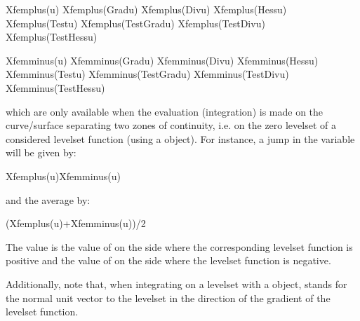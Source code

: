 \documentclass[a4paper,11pt,english]{sphinxmanual}
\begin{document}
\begin{sphinxVerbatim}[commandchars=\\\{\}]
Xfem\PYGZus{}plus(u)
Xfem\PYGZus{}plus(Grad\PYGZus{}u)
Xfem\PYGZus{}plus(Div\PYGZus{}u)
Xfem\PYGZus{}plus(Hess\PYGZus{}u)
Xfem\PYGZus{}plus(Test\PYGZus{}u)
Xfem\PYGZus{}plus(Test\PYGZus{}Grad\PYGZus{}u)
Xfem\PYGZus{}plus(Test\PYGZus{}Div\PYGZus{}u)
Xfem\PYGZus{}plus(Test\PYGZus{}Hess\PYGZus{}u)

Xfem\PYGZus{}minus(u)
Xfem\PYGZus{}minus(Grad\PYGZus{}u)
Xfem\PYGZus{}minus(Div\PYGZus{}u)
Xfem\PYGZus{}minus(Hess\PYGZus{}u)
Xfem\PYGZus{}minus(Test\PYGZus{}u)
Xfem\PYGZus{}minus(Test\PYGZus{}Grad\PYGZus{}u)
Xfem\PYGZus{}minus(Test\PYGZus{}Div\PYGZus{}u)
Xfem\PYGZus{}minus(Test\PYGZus{}Hess\PYGZus{}u)
\end{sphinxVerbatim}

which are only available when the evaluation (integration) is made on the curve/surface separating two zones of continuity, i.e. on the zero level\sphinxhyphen{}set of a considered level\sphinxhyphen{}set function (using a  object). For instance, a jump in the variable  will be given by:

\begin{sphinxVerbatim}[commandchars=\\\{\}]
Xfem\PYGZus{}plus(u)\PYGZhy{}Xfem\PYGZus{}minus(u)
\end{sphinxVerbatim}

and the average by:

\begin{sphinxVerbatim}[commandchars=\\\{\}]
(Xfem\PYGZus{}plus(u)+Xfem\PYGZus{}minus(u))/2
\end{sphinxVerbatim}

The value  is the value of  on the side where the corresponding level\sphinxhyphen{}set function is positive and  the value of  on the side where the level\sphinxhyphen{}set function is negative.

Additionally, note that, when integrating on a level\sphinxhyphen{}set with a  object,  stands for the normal unit vector to the level\sphinxhyphen{}set in the direction of the gradient of the level\sphinxhyphen{}set function.
\end{document}
